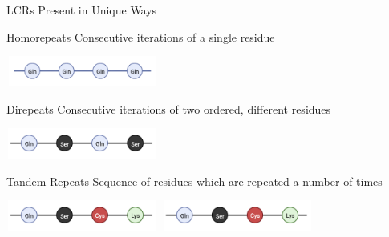 \documentclass{beamer}
\begin{document}
	\begin{frame}{LCRs Present in Unique Ways }
		
		\begin{alertblock}{Homorepeats}
			Consecutive iterations of a single residue
		\end{alertblock}
	
		\begin{center}
			\includegraphics[width=5cm, height=1cm]{poyglut.png}
		\end{center} \pause
	
		\begin{alertblock}{Direpeats}
			Consecutive iterations of two ordered, different residues
		\end{alertblock}
	
		\begin{center}
			\includegraphics[width=5cm, height=1cm]{direpeat.png}
		\end{center} \pause

		\begin{alertblock}{Tandem Repeats}
			Sequence of residues which are repeated a number of times
		\end{alertblock}
	
		\begin{center}
			\includegraphics[width=5cm, height=1cm]{tandem.png}
			\includegraphics[width=5cm, height=1cm]{tandem.png}
		\end{center}
	
	\end{frame}
\end{document}
